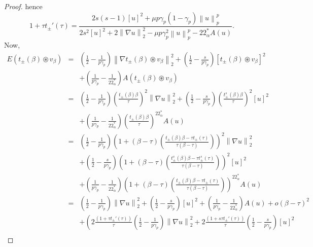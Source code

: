\documentclass[10pt,a4paper]{amsart}
\begin{document}
\begin{proof}
			hence
			\begin{equation}\label{4.18}
				1+\tau t_{\pm}'(\tau)=\frac{2s(s-1)[u]^2+\mu p\gamma_p(1-\gamma_p)\left\| u \right\|_p^p}{2s^2[u]^2+2\left\| \nabla u \right\|_2^2-\mu p\gamma_p^2\left\| u \right\|_p^p-22^*_{\alpha}A(u)}.
			\end{equation}
			Now, 
			\begin{eqnarray*}
				E(t_{\pm}(\beta)\circledast v_{\beta}) & = & \left(\frac{1}{2}-\frac{1}{p\gamma_p}\right)\left\| \nabla t_{\pm}(\beta)\circledast v_{\beta} \right\|_2^2+\left(\frac{1}{2}-\frac{s}{p\gamma_p}\right)[t_{\pm}(\beta)\circledast v_{\beta}]^2\\
				&& +\left(\frac{1}{p\gamma_p}-\frac{1}{22^*_{\alpha}}\right)A(t_{\pm}(\beta)\circledast v_{\beta})\\
				& = & \left(\frac{1}{2}-\frac{1}{p\gamma_p}\right)\left(\frac{t_{\pm}(\beta)\beta}{\tau}\right)^2\left\| \nabla u \right\|_2^2+\left(\frac{1}{2}-\frac{s}{p\gamma_p}\right)\left(\frac{t_{\pm}^{s}(\beta)\beta}{\tau}\right)^2[u]^2\\
				&& +\left(\frac{1}{p\gamma_p}-\frac{1}{22^*_{\alpha}}\right)\left(\frac{t_{\pm}(\beta)\beta}{\tau}\right)^{22^*_{\alpha}}A(u)\\
				&= &  \left(\frac{1}{2}-\frac{1}{p\gamma_p}\right)\left(1+(\beta-\tau)\left(\frac{t_{\pm}(\beta)\beta-\tau t_{\pm}(\tau)}{\tau(\beta-\tau)}\right)\right)^2\left\| \nabla u \right\|_2^2\\
				&& +\left(\frac{1}{2}-\frac{s}{p\gamma_p}\right)\left(1+(\beta-\tau)\left(\frac{t_{\pm}^s(\beta)\beta-\tau t_{\pm}^s(\tau)}{\tau(\beta-\tau)}\right)\right)^2[u]^2\\
				&& +\left(\frac{1}{p\gamma_p}-\frac{1}{22^*_{\alpha}}\right)\left(1+(\beta-\tau)\left(\frac{t_{\pm}(\beta)\beta-\tau t_{\pm}(\tau)}{\tau(\beta-\tau)}\right)\right)^{22^*_{\alpha}}A(u)\\
				& = & \left(\frac{1}{2}-\frac{1}{p\gamma_p}\right)\left\| \nabla u \right\|_2^2+\left(\frac{1}{2}-\frac{s}{p\gamma_p}\right)[u]^2+\left(\frac{1}{p\gamma_p}-\frac{1}{22^*_{\alpha}}\right)A(u) +o(\beta-\tau)^2\\
				&& +\left(2\frac{(1+\tau t_{\pm}'(\tau))}{\tau}\left(\frac{1}{2}-\frac{1}{p\gamma_p}\right)\left\| \nabla u \right\|_2^2+2\frac{(1+s\tau t_{\pm}'(\tau))}{\tau}\left(\frac{1}{2}-\frac{s}{p\gamma_p}\right) [u]^2\right.\\

\end{eqnarray*}
\end{proof}
\end{document}
